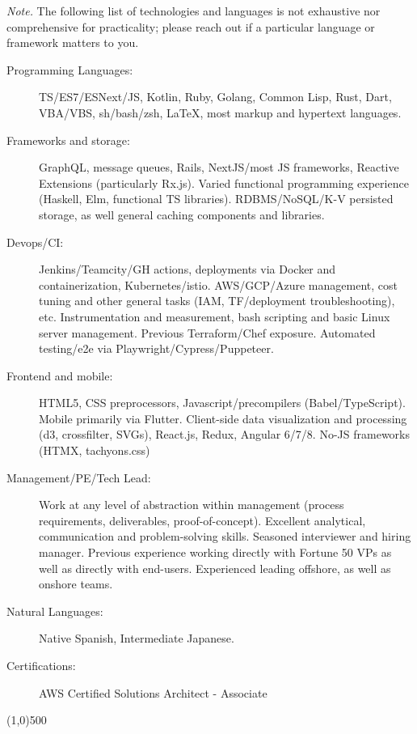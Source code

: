 \documentclass[letterpaper,11pt]{article}
\newcommand{\addline}{\line(1,0){500}}
\begin{document}
\vspace{2pt}
\textit{Note.} The following list of technologies and languages is not exhaustive nor comprehensive for practicality; please reach out if a particular language or framework matters to you.
\begin{description}
	\item[Programming Languages:]
    TS/ES7/ESNext/JS, Kotlin, Ruby, Golang, Common Lisp, Rust, Dart, VBA/VBS, sh/bash/zsh, \LaTeX, most markup and hypertext languages. 

	\item[Frameworks and storage:]
    GraphQL, message queues, Rails, NextJS/most JS frameworks, Reactive Extensions (particularly Rx.js). Varied functional programming experience (Haskell, Elm, functional TS libraries). RDBMS/NoSQL/K-V persisted storage, as well general caching components and libraries.

	\item [Devops/CI:]
    Jenkins/Teamcity/GH actions, deployments via Docker and containerization, Kubernetes/istio. AWS/GCP/Azure management, cost tuning and other general tasks (IAM, TF/deployment troubleshooting), etc. Instrumentation and measurement, bash scripting and basic Linux server management. Previous Terraform/Chef exposure. Automated testing/e2e via Playwright/Cypress/Puppeteer.

  \item [Frontend and mobile:]
    HTML5, CSS preprocessors, Javascript/precompilers (Babel/TypeScript). Mobile primarily via Flutter. Client-side data visualization and processing (d3, crossfilter, SVGs), React.js, Redux, Angular 6/7/8. No-JS frameworks (HTMX, tachyons.css)

	\item[Management/PE/Tech Lead:]
    Work at any level of abstraction within management (process requirements, deliverables, proof-of-concept). Excellent analytical, communication and problem-solving skills. Seasoned interviewer and hiring manager. Previous experience working directly with Fortune 50 VPs as well as directly with end-users. Experienced leading offshore, as well as onshore teams.

	\item[Natural Languages:]
		Native Spanish, Intermediate Japanese.

	\item[Certifications:]
		AWS Certified Solutions Architect - Associate

\end{description}
\addline
\end{document}
